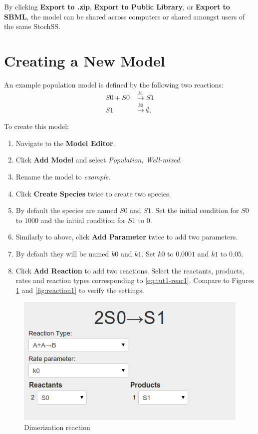 By clicking \textbf{Export to .zip}, \textbf{Export to Public Library}, or \textbf{Export to SBML}, the model can be shared across computers or shared amongst users of the same StochSS.

\section{Creating a New Model}
An example population model is defined by the following two reactions:
\begin{equation}
\label{eq:tut1-reac1}
\begin{aligned}
S0 + S0 &\xrightarrow{k1} S1\\
S1 &\xrightarrow{k0} \emptyset .  
\end{aligned}
\end{equation}

To create this model:
\begin{enumerate}
  \item Navigate to the \textbf{Model Editor}.
  \item Click \textbf{Add Model} and select \textit{Population, Well-mixed}.
  \item Rename the model to \textit{example}.
  \item Click \textbf{Create Species} twice to create two species.
  \item By default the species are named $S0$ and $S1$. Set the initial condition for $S0$ to $1000$ and the initial condition for $S1$ to $0$.
  \item Similarly to above, click \textbf{Add Parameter} twice to add two parameters.
  \item By default they will be named $k0$ and $k1$. Set $k0$ to $0.0001$ and $k1$ to $0.05$.
  \item Click \textbf{Add Reaction} to add two reactions. Select the reactants, products, rates and reaction types corresponding to \eqref{eq:tut1-reac1}. Compare to Figures \ref{fig:reaction2} and \ref{fig:reaction1} to verify the settings.
\end{enumerate}

\begin{figure}[!htb]
\centering
\includegraphics[scale=0.64]{T1/reaction2.png}
\caption{Dimerization reaction}
\label{fig:reaction2}
\end{figure}


